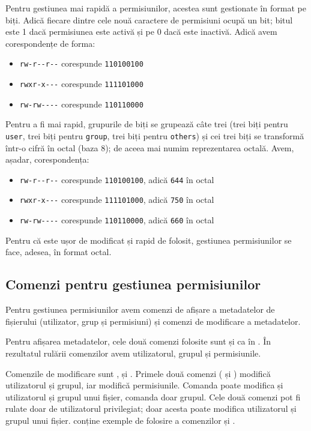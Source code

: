 Pentru gestiunea mai rapidă a permisiunilor, acestea sunt gestionate în format pe
biți. Adică fiecare dintre cele nouă caractere de permisiuni ocupă un bit; bitul
este 1 dacă permisiunea este activă și pe 0 dacă este inactivă. Adică avem
corespondențe de forma:

\begin{itemize}
  \item \texttt{rw-r-{}-r-{}-} corespunde \texttt{110100100}
  \item \texttt{rwxr-x-{}-{}-} corespunde \texttt{111101000}
  \item \texttt{rw-rw-{}-{}-{}-} corespunde \texttt{110110000}
\end{itemize}

Pentru a fi mai rapid, grupurile de biți se grupează câte trei (trei biți pentru \texttt{user},
trei biți pentru \texttt{group}, trei biți pentru \texttt{others}) și cei trei biți se transformă într-o
cifră în octal (baza 8); de aceea mai numim reprezentarea octală. Avem, așadar,
corespondența:

\begin{itemize}
  \item \texttt{rw-r-{}-r-{}-} corespunde \texttt{110100100}, adică \texttt{644} în octal
  \item \texttt{rwxr-x-{}-{}-} corespunde \texttt{111101000}, adică \texttt{750} în octal
  \item \texttt{rw-rw-{}-{}-{}-} corespunde \texttt{110110000}, adică \texttt{660} în octal
\end{itemize}

Pentru că este ușor de modificat și rapid de folosit, gestiunea permisiunilor
se face, adesea, în format octal.

\subsection{Comenzi pentru gestiunea permisiunilor}
\label{sec:user:perm-cmd}

Pentru gestiunea permisiunilor avem comenzi de afișare a metadatelor de
fișierului (utilizator, grup și permisiuni) și comenzi de modificare a
metadatelor.

Pentru afișarea metadatelor, cele două comenzi folosite sunt  și 
ca în . În rezultatul rulării comenzilor avem utilizatorul, grupul și permisiunile.

Comenzile de modificare sunt ,  și . Primele două comenzi (
și ) modifică utilizatorul și grupul, iar  modifică permisiunile. Comanda
 poate modifica și utilizatorul și grupul unui fișier, comanda  doar
grupul. Cele două comenzi pot fi rulate doar de utilizatorul privilegiat; doar
acesta poate modifica utilizatorul și grupul unui fișier.  conține exemple
de folosire a comenzilor  și .

